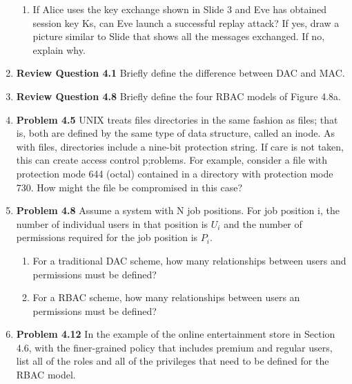 \documentclass[12pt]{article}
\begin{document}
\begin{enumerate}
\begin{enumerate}
  \item If Alice uses the key exchange shown in Slide 3 and Eve has obtained session key Ks, can Eve launch a successful replay attack? If yes, draw a picture similar to Slide that shows all the messages exchanged. If no, explain why. \\
\end{enumerate}

\item \textbf{Review Question 4.1} Briefly define the difference between DAC and MAC.

\item \textbf{Review Question 4.8} Briefly define the four RBAC models of Figure 4.8a.

\item \textbf{Problem 4.5} UNIX treats files directories in the same fashion as files; that is, both are defined by the same type of data structure, called an inode. As with files, directories include a nine-bit protection string. If care is not taken, this can create access control p;roblems. For example, consider a file with protection mode 644 (octal) contained in a directory with protection mode 730. How might the file be compromised in this case?

\item \textbf{Problem 4.8} Assume a system with N job positions. For job position i, the number of individual users in that position is $U_{i}$ and the number of permissions required for the job position is $P_i$.
  \begin{enumerate}
    \item For a traditional DAC scheme, how many relationships between users and permissions must be defined? \\

    \item For a RBAC scheme, how many relationships between users an permissions must be defined? \\
  \end{enumerate}

\item \textbf{Problem 4.12} In the example of the online entertainment store in Section 4.6, with the finer-grained policy that includes premium and regular users, list all of the roles and all of the privileges that need to be defined for the RBAC model.

\end{enumerate}
\end{document}
